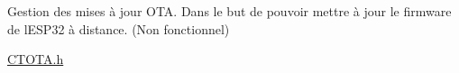 Gestion des mises à jour OTA. Dans le but de pouvoir mettre à jour le firmware de l\textquotesingle{}ESP32 à distance. (Non fonctionnel)

\mbox{\hyperlink{_c_t_o_t_a_8h}{CTOTA.\+h}} 